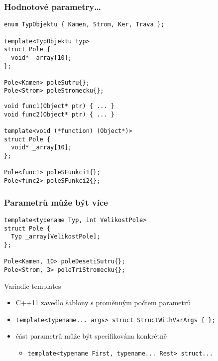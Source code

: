 \begin{frame}[fragile]
\frametitle{Hodnotové parametry\ldots}
\begin{yesblock}
\begin{lstlisting}[basicstyle=\scriptsize]
enum TypObjektu { Kamen, Strom, Ker, Trava };

template<TypObjektu typ> 
struct Pole {
  void* _array[10];
};

Pole<Kamen> poleSutru{};
Pole<Strom> poleStromecku{};
\end{lstlisting}
\end{yesblock}

\begin{yesblock}
\begin{lstlisting}[basicstyle=\scriptsize]
void func1(Object* ptr) { ... }
void func2(Object* ptr) { ... }

template<void (*function) (Object*)> 
struct Pole {
  void* _array[10];
};

Pole<func1> poleSFunkci1{};
Pole<func2> poleSFunkci2{};
\end{lstlisting}
\end{yesblock}
\end{frame}






\begin{frame}[fragile]
\frametitle{Parametrů může být více}
\begin{yesblock}
\begin{lstlisting}[basicstyle=\small]
template<typename Typ, int VelikostPole> 
struct Pole {
  Typ _array[VelikostPole];
};

Pole<Kamen, 10> poleDesetiSutru{};
Pole<Strom, 3> poleTriStromecku{};
\end{lstlisting}
\end{yesblock}

\begin{bonusblock}{Variadic templates}
\begin{itemize}
\item C++11 zavedlo šablony s proměnným počtem parametrů
\item \lstinline|template<typename... args> struct StructWithVarArgs { };|
\item část parametrů může být specifikována konkrétně
\begin{itemize}
\item \lstinline|template<typename First, typename... Rest> struct...|
\end{itemize}
\end{itemize}
\end{bonusblock}
\end{frame}







